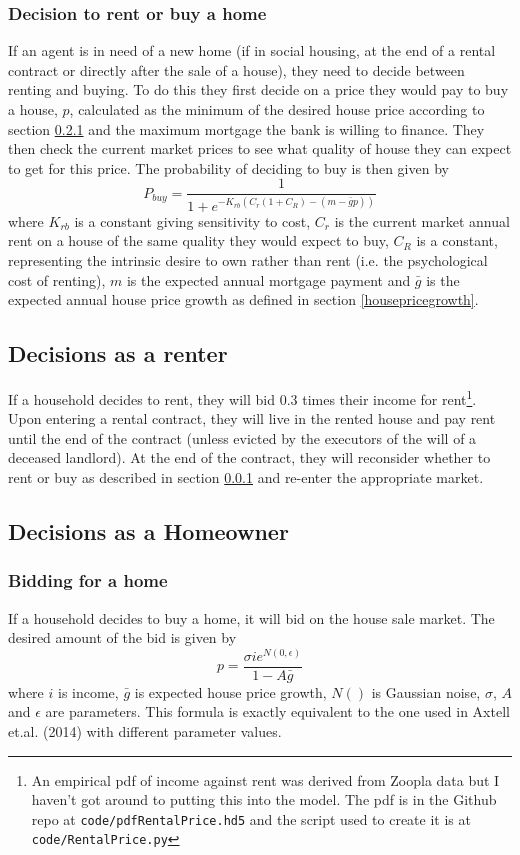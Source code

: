 \documentclass{report}
\begin{document}
\subsubsection{Decision to rent or buy a home}
\label{rentorbuy}
If an agent is in need of a new home (if in social housing, at the end of a rental contract or directly after the sale of a house), they need to decide between renting and buying. To do this they first decide on a price they would pay to buy a house, $p$, calculated as the minimum of the desired house price according to section \ref{buyahome} and the maximum mortgage the bank is willing to finance. They then check the current market prices to see what quality of house they can expect to get for this price. The probability of deciding to buy is then given by
\begin{equation}
P_{buy} = \frac{1}{1 + e^{-K_{rb}(C_{r}(1+C_R) - (m - \bar{g}p))}}
\end{equation}
where $K_{rb}$ is a constant giving sensitivity to cost, $C_{r}$ is the current market annual rent on a house of the same quality they would expect to buy, $C_R$ is a constant, representing the intrinsic desire to own rather than rent (i.e. the psychological cost of renting), $m$ is the expected annual mortgage payment and $\bar{g}$ is the expected annual house price growth as defined in section \ref{housepricegrowth}.

\subsection{Decisions as a renter}
If a household decides to rent, they will bid 0.3 times their income for rent\footnote{An empirical pdf of income against rent was derived from Zoopla data but I haven't got around to putting this into the model. The pdf is in the Github repo at \texttt{code/pdfRentalPrice.hd5} and the script used to create it is at \texttt{code/RentalPrice.py}}. Upon entering a rental contract, they will live in the rented house and pay rent until the end of the contract (unless evicted by the executors of the will of a deceased landlord). At the end of the contract, they will reconsider whether to rent or buy as described in section \ref{rentorbuy} and re-enter the appropriate market.

\subsection{Decisions as a Homeowner}

\subsubsection{Bidding for a home}
\label{buyahome}
If a household decides to buy a home, it will bid on the house sale market. The desired amount of the bid is given by
\begin{equation}
p = \frac{\sigma i e^{N(0,\epsilon)}}{1 - A\bar{g}}
\end{equation}
where $i$ is income, $\bar{g}$ is expected house price growth, $N()$ is Gaussian noise, $\sigma$, $A$ and $\epsilon$ are parameters. This formula is exactly equivalent to the one used in Axtell et.al. (2014) with different parameter values.
\end{document}
